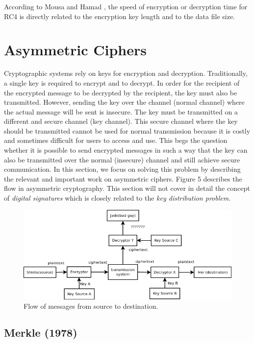 \documentclass{article}
\begin{document}
According to Mousa and Hamad \cite{mousa2006}, the speed of encryption or decryption time for RC4 is directly related to the encryption key length and to the data file size.

\section{Asymmetric Ciphers}

Cryptographic systems rely on keys for encryption and decryption.
Traditionally, a single key is required to encrypt and to decrypt.
In order for the recipient of the encrypted message to be decrypted
by the recipient, the key must also be transmitted. However, sending
the key over the channel (normal channel) where the actual message
will be sent is insecure. The key must be transmitted on a different
and secure channel (key channel)\cite{merkle_secure_1978}. This secure
channel where the key should be transmitted cannot be used for normal
transmission because it is costly and sometimes difficult for users
to access and use\cite{merkle_secure_1978}. This begs the question
whether it is possible to send encrypted messages in such a way that
the key can also be transmitted over the normal (insecure) channel
and still achieve secure communication. In this section, we focus
on solving this problem by describing the relevant and important work
on asymmetric ciphers. Figure 5 describes the flow in asymmetric cryptography.
This section will not cover in detail the concept of \textit{digital
signatures} which is closely related to the \textit{key distribution
problem}.

\begin{figure}[h]
\caption{Flow of messages from source to destination.}


\includegraphics[scale=0.45]{flowchart1}
\end{figure}



\subsection{Merkle (1978)}
\end{document}

